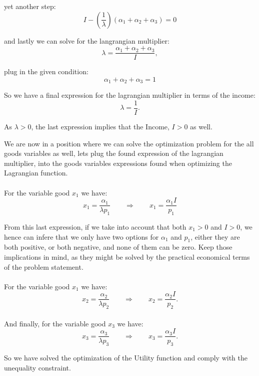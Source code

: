 \documentclass{article}
\begin{document}
yet another step:
\begin{equation}
   I - \left( \frac{1}{\lambda} \right) (\alpha_1 + \alpha_2+ \alpha_3) = 0
\end{equation}

and lastly we can solve for the langrangian multiplier:
\begin{equation}
   \lambda =  \frac{\alpha_1 + \alpha_2+ \alpha_3}{I},
\end{equation}

plug in the given condition:
\begin{equation}
  \alpha_1 + \alpha_2+ \alpha_3 = 1
\end{equation}

So we have a final expression for the lagrangian multiplier in terms of the income:
\begin{equation}
   \lambda =  \frac{1}{I}.
\end{equation}

As $\lambda > 0$, the last expression implies that the Income, $I > 0$ as well.

\medskip

We are now in a position where we can solve the optimization problem for the all goods variables as well, lets plug the found expression of the lagrangian multiplier, into the goods variables expressions found when optimizing the Lagrangian function.

\paragraph{}
For the variable good $x_1$ we have:
\begin{equation}
  x_1 = \frac{\alpha_1}{\lambda p_1} \qquad \Rightarrow \qquad x_1 = \frac{\alpha_1 I}{ p_1}
\end{equation}

From this last expression, if we take into account that both $x_1 > 0$ and $I > 0$, we hence can infere that we only have two options for $\alpha_1$ and $p_1$, either they are both positive, or both negative, and none of them can be zero. Keep those implications in mind, as they might be solved by the practical economical terms of the problem statement.

\paragraph{}
For the variable good $x_1$ we have:
\begin{equation}
  x_2 = \frac{\alpha_2}{\lambda p_2} \qquad \Rightarrow \qquad x_2 = \frac{\alpha_2 I}{ p_2}.
\end{equation}

\paragraph{}
And finally, for the variable good $x_3$ we have:
\begin{equation}
  x_3 = \frac{\alpha_3}{\lambda p_3} \qquad \Rightarrow \qquad x_3 = \frac{\alpha_3 I}{ p_3}.
\end{equation}

So we have solved the optimization of the Utility function and comply with the unequality constraint.
\end{document}
